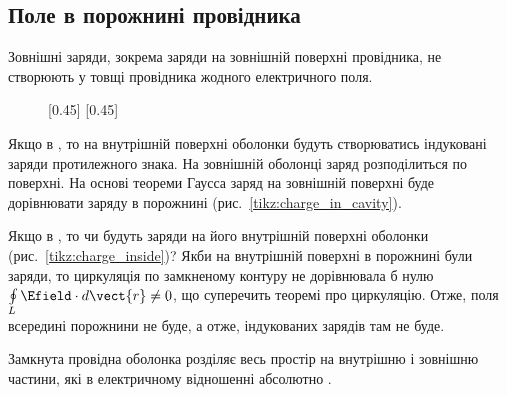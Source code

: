 \subsection*{Поле в порожнині провідника}



Зовнішні заряди, зокрема заряди на зовнішній поверхні провідника, не створюють у товщі
провідника жодного електричного поля. 

\begin{figure}[h!]\centering
[0.45\linewidth]{
    \centering
}
[0.45\linewidth]{
    \centering
}
\end{figure}

Якщо в , то на внутрішній
поверхні оболонки будуть створюватись індуковані заряди протилежного знака. На
зовнішній оболонці заряд розподілиться по поверхні. На основі теореми Гаусса заряд
на зовнішній поверхні буде дорівнювати заряду в порожнині (рис.~\ref{tikz:charge_in_cavity}).



Якщо в , то чи будуть заряди на його внутрішній поверхні
оболонки (рис.~\ref{tikz:charge_inside})? Якби на внутрішній поверхні в порожнині були заряди, то циркуляція по замкненому контуру не дорівнювала б нулю
$\oint\limits_L \Efield\cdot d\vect{r} \neq 0$, що суперечить теоремі про циркуляцію. Отже, поля всередині порожнини не буде, а отже, індукованих
зарядів там не буде.




\begin{Attention}
	Замкнута провідна оболонка розділяє весь простір на внутрішню і зовнішню частини, які в
	електричному відношенні абсолютно .
\end{Attention}



